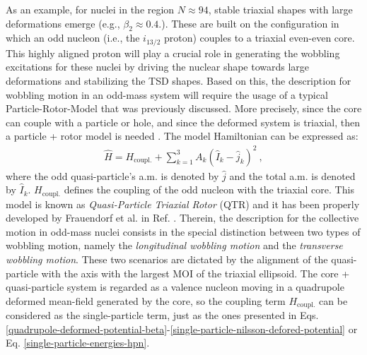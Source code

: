 As an example, for nuclei in the region $N\approx 94$, stable triaxial shapes with large deformations emerge (e.g., $\beta_2\approx0.4$.). These are built on the configuration in which an odd nucleon (i.e., the $i_{13/2}$ proton) couples to a triaxial even-even core. This highly aligned proton will play a crucial role in generating the wobbling excitations for these nuclei by driving the nuclear shape towards large deformations and stabilizing the TSD shapes. Based on this, the description for wobbling motion in an odd-mass system will require the usage of a typical Particle-Rotor-Model that was previously discussed. More precisely, since the core can couple with a particle or hole, and since the deformed system is triaxial, then a particle + rotor model is needed \cite{frauendorf2014transverse}. The model Hamiltonian can be expressed as:
\begin{align}
    \hat{H}=H_\text{coupl.}+\sum_{k=1}^{3}A_k(\hat{I}_k-\hat{j}_k)^2\ ,
    \label{oddA-QTR-general-hamiltonian}
\end{align}
where the odd quasi-particle's a.m. is denoted by $\hat{j}$ and the total a.m. is denoted by $\hat{I}_k$. $H_\text{coupl.}$ defines the coupling of the odd nucleon with the triaxial core. This model is known as \emph{Quasi-Particle Triaxial Rotor} (QTR) and it has been properly developed by Frauendorf et al. in Ref. \cite{frauendorf2014transverse}. Therein, the description for the collective motion in odd-mass nuclei consists in the special distinction between two types of wobbling motion, namely the \emph{longitudinal wobbling motion} and the \emph{transverse wobbling motion}. These two scenarios are dictated by the alignment of the quasi-particle with the axis with the largest MOI of the triaxial ellipsoid. The core + quasi-particle system is regarded as a valence nucleon moving in a quadrupole deformed mean-field generated by the core, so the coupling term $H_\text{coupl.}$ can be considered as the single-particle term, just as the ones presented in Eqs. \ref{quadrupole-deformed-potential-beta}-\ref{single-particle-nilsson-defored-potential} or Eq. \ref{single-particle-energies-hpn}.

